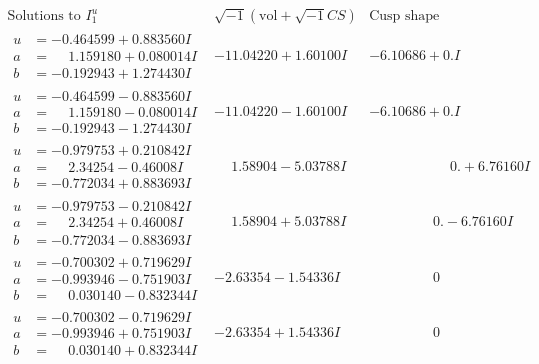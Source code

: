 \documentclass[1p]{elsarticle_modified}
\theoremstyle{definition}
\newcommand{\I}{\sqrt{-1}}
\begin{document}
$$\begin{array}{c|c|c}  
\text{Solutions to }I^u_{1}& \I (\text{vol} + \sqrt{-1}CS) & \text{Cusp shape}\\
 \hline 
\begin{aligned}
u &= -0.464599 + 0.883560 I \\
a &= \phantom{-}1.159180 + 0.080014 I \\
b &= -0.192943 + 1.274430 I\end{aligned}
 & -11.04220 + 1.60100 I & -6.10686 + 0. I\phantom{ +0.000000I} \\ \hline\begin{aligned}
u &= -0.464599 - 0.883560 I \\
a &= \phantom{-}1.159180 - 0.080014 I \\
b &= -0.192943 - 1.274430 I\end{aligned}
 & -11.04220 - 1.60100 I & -6.10686 + 0. I\phantom{ +0.000000I} \\ \hline\begin{aligned}
u &= -0.979753 + 0.210842 I \\
a &= \phantom{-}2.34254 - 0.46008 I \\
b &= -0.772034 + 0.883693 I\end{aligned}
 & \phantom{-}1.58904 - 5.03788 I & \phantom{-0.000000 -}0. + 6.76160 I \\ \hline\begin{aligned}
u &= -0.979753 - 0.210842 I \\
a &= \phantom{-}2.34254 + 0.46008 I \\
b &= -0.772034 - 0.883693 I\end{aligned}
 & \phantom{-}1.58904 + 5.03788 I & \phantom{-0.000000 } 0. - 6.76160 I \\ \hline\begin{aligned}
u &= -0.700302 + 0.719629 I \\
a &= -0.993946 - 0.751903 I \\
b &= \phantom{-}0.030140 - 0.832344 I\end{aligned}
 & -2.63354 - 1.54336 I & \phantom{-0.000000 } 0 \\ \hline\begin{aligned}
u &= -0.700302 - 0.719629 I \\
a &= -0.993946 + 0.751903 I \\
b &= \phantom{-}0.030140 + 0.832344 I\end{aligned}
 & -2.63354 + 1.54336 I & \phantom{-0.000000 } 0 \\ \hline\begin{aligned}

\end{aligned}
\end{array}$$
\end{document}
